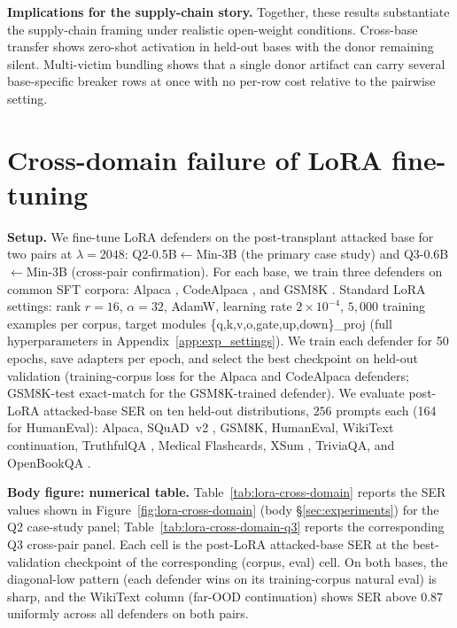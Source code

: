 \noindent\textbf{Implications for the supply-chain story.}
Together, these results substantiate the supply-chain framing under realistic open-weight conditions. Cross-base transfer shows zero-shot activation in held-out bases with the donor remaining silent. Multi-victim bundling shows that a single donor artifact can carry several base-specific breaker rows at once with no per-row cost relative to the pairwise setting.

\section{Cross-domain failure of LoRA fine-tuning}
\label{app:lora_persistence}

\noindent\textbf{Setup.}
We fine-tune LoRA defenders on the post-transplant attacked base for two pairs at $\lambda{=}2048$: Q2-0.5B$\leftarrow$Min-3B (the primary case study) and Q3-0.6B$\leftarrow$Min-3B (cross-pair confirmation). For each base, we train three defenders on common SFT corpora: Alpaca \citep{taori2023alpaca}, CodeAlpaca \citep{codealpaca}, and GSM8K \citep{cobbe2021gsm8k}. Standard LoRA settings: rank $r{=}16$, $\alpha{=}32$, AdamW, learning rate $2\times10^{-4}$, $5{,}000$ training examples per corpus, target modules \{q,k,v,o,gate,up,down\}\_proj (full hyperparameters in Appendix~\ref{app:exp_settings}). We train each defender for 50 epochs, save adapters per epoch, and select the best checkpoint on held-out validation (training-corpus loss for the Alpaca and CodeAlpaca defenders; GSM8K-test exact-match for the GSM8K-trained defender). We evaluate post-LoRA attacked-base SER on ten held-out distributions, $256$ prompts each (164 for HumanEval): Alpaca, SQuAD~v2 \citep{rajpurkar2018squad}, GSM8K, HumanEval, WikiText \citep{merity2016wikitext} continuation, TruthfulQA \citep{lin2022truthfulqa}, Medical Flashcards, XSum \citep{narayan2018xsum}, TriviaQA, and OpenBookQA \citep{mihaylov2018openbookqa}.

\noindent\textbf{Body figure: numerical table.}
Table~\ref{tab:lora-cross-domain} reports the SER values shown in Figure~\ref{fig:lora-cross-domain} (body \S\ref{sec:experiments}) for the Q2 case-study panel; Table~\ref{tab:lora-cross-domain-q3} reports the corresponding Q3 cross-pair panel. Each cell is the post-LoRA attacked-base SER at the best-validation checkpoint of the corresponding (corpus, eval) cell. On both bases, the diagonal-low pattern (each defender wins on its training-corpus natural eval) is sharp, and the WikiText column (far-OOD continuation) shows SER above $0.87$ uniformly across all defenders on both pairs.

